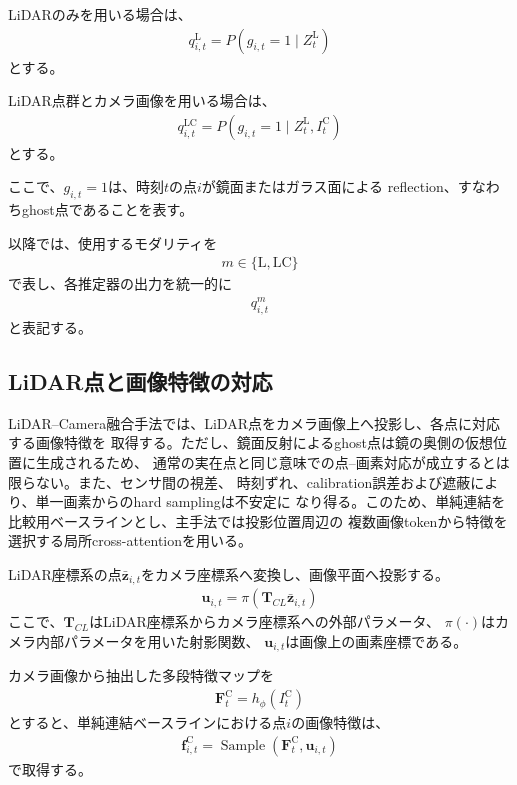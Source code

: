 \documentclass[uplatex,a4paper,11pt]{jsarticle}
\begin{document}
LiDARのみを用いる場合は、
\begin{align}
  q_{i,t}^{\mathrm{L}}
  =
  P
  \left(
    g_{i,t}=1
    \mid
    Z_t^{\mathrm{L}}
  \right)
\end{align}
とする。

LiDAR点群とカメラ画像を用いる場合は、
\begin{align}
  q_{i,t}^{\mathrm{LC}}
  =
  P
  \left(
    g_{i,t}=1
    \mid
    Z_t^{\mathrm{L}},
    I_t^{\mathrm{C}}
  \right)
\end{align}
とする。

ここで、$g_{i,t}=1$は、時刻$t$の点$i$が鏡面またはガラス面による
reflection、すなわちghost点であることを表す。

以降では、使用するモダリティを
\begin{align}
  m\in\{\mathrm{L},\mathrm{LC}\}
\end{align}
で表し、各推定器の出力を統一的に
\begin{align}
  q_{i,t}^{m}
\end{align}
と表記する。

\subsection{LiDAR点と画像特徴の対応}

LiDAR--Camera融合手法では、LiDAR点をカメラ画像上へ投影し、各点に対応する画像特徴を
取得する。ただし、鏡面反射によるghost点は鏡の奥側の仮想位置に生成されるため、
通常の実在点と同じ意味での点--画素対応が成立するとは限らない。また、センサ間の視差、
時刻ずれ、calibration誤差および遮蔽により、単一画素からのhard samplingは不安定に
なり得る。このため、単純連結を比較用ベースラインとし、主手法では投影位置周辺の
複数画像tokenから特徴を選択する局所cross-attentionを用いる。

LiDAR座標系の点$\bar{\bm{z}}_{i,t}$をカメラ座標系へ変換し、画像平面へ投影する。
\begin{align}
  \bm{u}_{i,t}
  =
  \pi
  \left(
    \bm{T}_{CL}
    \bar{\bm{z}}_{i,t}
  \right)
\end{align}
ここで、$\bm{T}_{CL}$はLiDAR座標系からカメラ座標系への外部パラメータ、
$\pi(\cdot)$はカメラ内部パラメータを用いた射影関数、
$\bm{u}_{i,t}$は画像上の画素座標である。

カメラ画像から抽出した多段特徴マップを
\begin{align}
  \bm{F}_t^{\mathrm{C}}
  =
  h_{\phi}
  \left(
    I_t^{\mathrm{C}}
  \right)
\end{align}
とすると、単純連結ベースラインにおける点$i$の画像特徴は、
\begin{align}
  \bm{f}_{i,t}^{\mathrm{C}}
  =
  \operatorname{Sample}
  \left(
    \bm{F}_t^{\mathrm{C}},
    \bm{u}_{i,t}
  \right)
\end{align}
で取得する。
\end{document}

